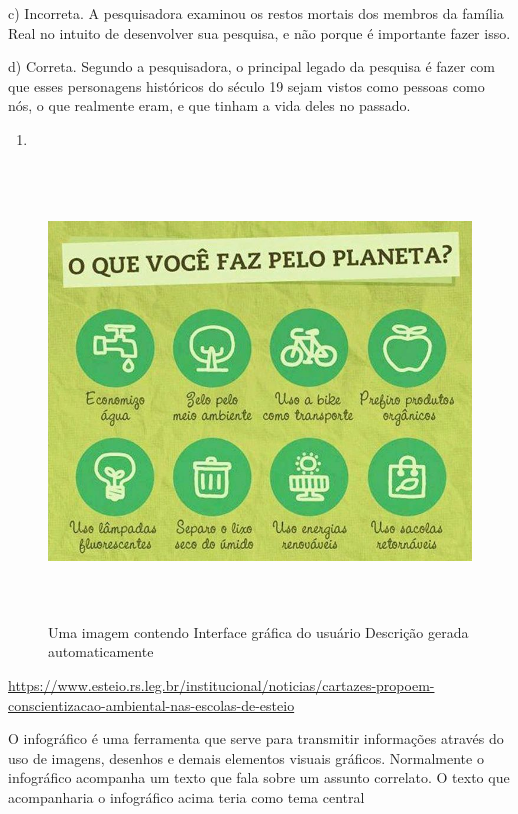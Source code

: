 c) Incorreta. A pesquisadora examinou os restos mortais dos membros da
família Real no intuito de desenvolver sua pesquisa, e não porque é
importante fazer isso.

d) Correta. Segundo a pesquisadora, o principal legado da pesquisa é
fazer com que esses personagens históricos do século 19 sejam vistos
como pessoas como nós, o que realmente eram, e que tinham a vida deles
no passado.

\begin{enumerate}
\def\labelenumi{\arabic{enumi}.}
\setcounter{enumi}{14}
\tightlist
\item
\end{enumerate}

\begin{figure}
\centering
\includegraphics[width=5.90556in,height=4.73611in]{./imgSAEB_6_POR/media/image37.png}
\caption{Uma imagem contendo Interface gráfica do usuário Descrição
gerada automaticamente}
\end{figure}

\url{https://www.esteio.rs.leg.br/institucional/noticias/cartazes-propoem-conscientizacao-ambiental-nas-escolas-de-esteio}

O infográfico é uma ferramenta que serve para transmitir informações
através do uso de imagens, desenhos e demais elementos visuais gráficos.
Normalmente o infográfico acompanha um texto que fala sobre um assunto
correlato. O texto que acompanharia o infográfico acima teria como tema
central

